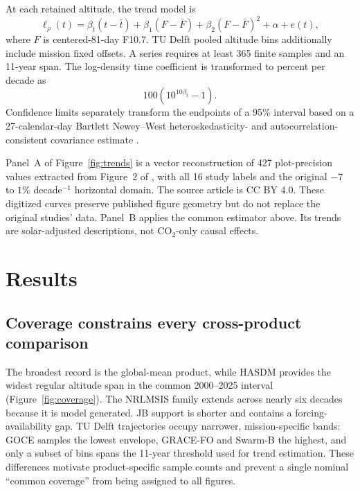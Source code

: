 \documentclass[11pt]{article}
\begin{document}
At each retained altitude, the trend model is
\begin{equation}
\ell_\rho(t)=\beta_t(t-\bar t)+\beta_1(F-\bar F)
 +\beta_2(F-\bar F)^2+\alpha+e(t),
\end{equation}
where $F$ is centered-81-day F10.7.  TU Delft pooled altitude bins additionally
include mission fixed offsets.  A series requires at least 365 finite samples
and an 11-year span.  The log-density time coefficient is transformed to
percent per decade as
\begin{equation}
  100\left(10^{10\beta_t}-1\right).
\end{equation}
Confidence limits separately transform the endpoints of a 95\% interval based
on a 27-calendar-day Bartlett Newey--West heteroskedasticity- and
autocorrelation-consistent covariance estimate \citep{neweywest1987}.

Panel~A of Figure~\ref{fig:trends} is a vector reconstruction of 427
plot-precision values extracted from Figure~2 of \citet{brown2024}, with all 16
study labels and the original $-7$ to $1\%$ decade$^{-1}$ horizontal domain.
The source article is CC BY 4.0.  These digitized curves preserve published
figure geometry but do not replace the original studies' data.  Panel~B applies
the common estimator above.  Its trends are solar-adjusted descriptions, not
CO$_2$-only causal effects.

\section{Results}

\subsection{Coverage constrains every cross-product comparison}

The broadest record is the global-mean product, while HASDM provides the widest
regular altitude span in the common 2000--2025 interval
(Figure~\ref{fig:coverage}).  The NRLMSIS family extends across nearly six
decades because it is model generated.  JB support is shorter and contains a
forcing-availability gap.  TU Delft trajectories occupy narrower,
mission-specific bands: GOCE samples the lowest envelope, GRACE-FO and Swarm-B
the highest, and only a subset of bins spans the 11-year threshold used for
trend estimation.  These differences motivate product-specific sample counts
and prevent a single nominal ``common coverage'' from being assigned to all
figures.
\end{document}
